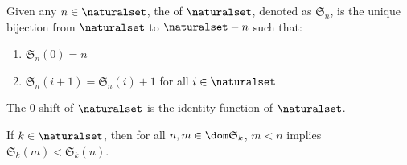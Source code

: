 \begin{dfn}
     \label{dfn:metatheory-n-shift-of-N}
    Given any \( n \in \naturalset \), the  of \( \naturalset \), denoted as \( \mathfrak{S}_{n} \),
    is the unique bijection from \( \naturalset \) to \( \naturalset - n \)
    such that:
    \begin{enumerate}[topsep=2pt,label=\textup{\texttt{(\alph*)}}]
        \item \( \mathfrak{S}_{n}(0) = n \)
        \item \( \mathfrak{S}_{n}(i + 1) = \mathfrak{S}_{n}(i) + 1  \) for all \( i \in \naturalset \)
    \end{enumerate}
\end{dfn}

\begin{cor}
     \label{cor:metatheory-0-shift-of-N-is-the-identity-function-of-N}
    The \( 0 \)-shift of \( \naturalset \) is the identity function of \( \naturalset \).
\end{cor}

\begin{thm}
     \label{thm:metatheory-n-shift-of-N-is-monotonic}
    If \( k \in \naturalset \), then for all \( n, m \in \dom \mathfrak{S}_{k} \),
    \( m < n \) implies \( \mathfrak{S}_{k}(m) < \mathfrak{S}_{k}(n) \).
\end{thm}

